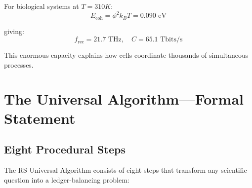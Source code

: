 \documentclass[12pt,a4paper]{article}
\begin{document}
For biological systems at $T = 310K$:
\begin{equation}
E_{\text{coh}} = \phi^2 k_B T = 0.090 \text{ eV}
\end{equation}

giving:
\begin{equation}
f_{\text{rec}} = 21.7 \text{ THz}, \quad C = 65.1 \text{ Tbits/s}
\end{equation}

This enormous capacity explains how cells coordinate thousands of simultaneous processes.

\section{The Universal Algorithm—Formal Statement}

\subsection{Eight Procedural Steps}

The RS Universal Algorithm consists of eight steps that transform any scientific question into a ledger-balancing problem:
\end{document}
